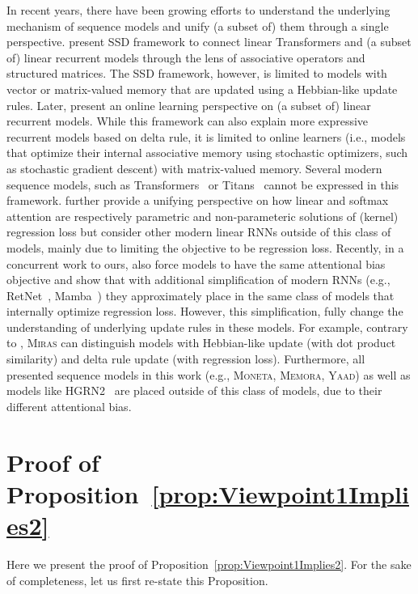 \documentclass{article}
\newcommand{\citep}{\parencite}
\newcommand{\citet}{\textcite}
\newcommand{\framework}[0]{\textsc{Miras}}
\newcommand{\ymodel}[0]{\textsc{Yaad}}
\newcommand{\mmodel}[0]{\textsc{Moneta}}
\newcommand{\xmodel}[0]{\textsc{Memora}}
\theoremstyle{plain}
\theoremstyle{definition}
\theoremstyle{remark}
\newcommand{\head}[1]{\vspace{1.7mm}\noindent{{\textcolor{c2}{\bf #1.}}}}
\begin{document}
\head{Unifying Frameworks}
In recent years, there have been growing efforts to understand the underlying mechanism of sequence models and unify (a subset of) them through a single perspective. \citet{dao2024transformers} present SSD framework to connect linear Transformers and (a subset of) linear recurrent models through the lens of associative operators and structured matrices. The SSD framework, however, is limited to models with vector or matrix-valued memory that are updated using a Hebbian-like update rules. Later, \citet{liu2024longhorn} present an online learning perspective on (a subset of) linear recurrent models. While this framework can also explain more expressive recurrent models based on delta rule, it is limited to online learners (i.e., models that optimize their internal associative memory using stochastic optimizers, such as stochastic gradient descent) with matrix-valued memory. Several modern sequence models, such as Transformers~\citep{transformers} or Titans~\citep{behrouz2024titans} cannot be expressed in this framework.  \citet{sun2024learning} further provide a unifying perspective on how linear and softmax attention are respectively parametric and non-parameteric solutions of (kernel) regression loss but consider other modern linear RNNs outside of this class of models, mainly due to limiting the objective to be regression loss. Recently, in a concurrent work to ours, \citet{wang2025test} also force models to have the same attentional bias objective and show that with additional simplification of modern RNNs (e.g., RetNet~\citep{sun2023retentive}, Mamba~\citep{dao2024transformers}) they approximately place in the same class of models that internally optimize regression loss. However, this simplification, fully change the understanding of underlying update rules in these models. For example, contrary to \citet{wang2025test}, \framework{} can distinguish models with Hebbian-like update (with dot product similarity) and delta rule update (with regression loss). Furthermore, all presented sequence models in this work (e.g., \mmodel, \xmodel, \ymodel) as well as models like HGRN2~\citep{qin2024hgrn} are placed outside of this class of models, due to their different attentional bias.

\section{Proof of Proposition~\ref{prop:Viewpoint1Implies2}} \label{app:proof}
Here we present the proof of Proposition~\ref{prop:Viewpoint1Implies2}. For the sake of completeness, let us first re-state this Proposition.
\end{document}
